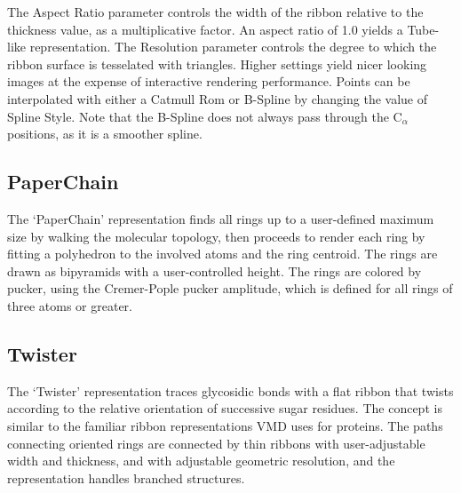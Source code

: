 The {\sf Aspect Ratio} parameter controls the width of the ribbon relative
to the thickness value, as a multiplicative factor.  An aspect ratio of 1.0
yields a Tube-like representation.  The {\sf Resolution} parameter controls
the degree to which the ribbon surface is tesselated with triangles.  Higher
settings yield nicer looking images at the expense of interactive rendering
performance. Points can be interpolated with either a Catmull Rom or
B-Spline by changing the value of {\sf Spline Style}. Note that the B-Spline
does not always pass through the C${}_\alpha$ positions, as it is a smoother
spline.


\subsection{PaperChain}
\label{ug:topic:drawmethods:paperchain}
The `PaperChain' representation finds all rings up to a user-defined
maximum size by walking the molecular topology, then proceeds to render
each ring by fitting a polyhedron to the involved atoms and the ring centroid.
The rings are drawn as bipyramids with a user-controlled height.  The
rings are colored by pucker, using the Cremer-Pople pucker amplitude,
which is defined for all rings of three atoms or greater.

\subsection{Twister}
\label{ug:topic:drawmethods:twister}
The `Twister' representation traces glycosidic bonds with a flat
ribbon that twists according to the relative orientation of 
successive sugar residues.  The concept is similar to the familiar
ribbon representations VMD uses for proteins.  The paths connecting
oriented rings are connected by thin ribbons with user-adjustable
width and thickness, and with adjustable geometric resolution, and
the representation handles branched structures.

